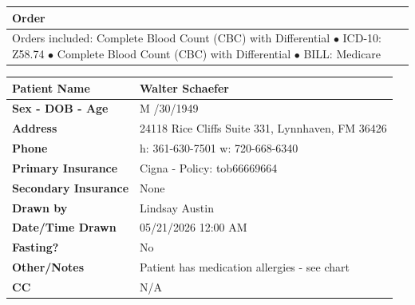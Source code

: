\documentclass[11pt]{article}
\begin{document}
\vspace{-1pt}


\begin{tabularx}{\textwidth}{|X|}
\hline
\textbf{Order}
\\
\hline

Orders included:
Complete Blood Count (CBC) with Differential
$\bullet$
ICD-10:
Z58.74
$\bullet$
Complete Blood Count (CBC) with Differential
$\bullet$
BILL:
Medicare

\\
\hline
\end{tabularx}

\vspace{-1pt}


\begin{tabularx}{\textwidth}{|p{2.9in}|X|}
\hline
\textbf{Patient Name}
&
Walter Schaefer
\\
\hline

\textbf{Sex - DOB - Age}
&
M
\quad
06/30/1949
\quad
76
\\
\hline

\textbf{Address}
&
24118 Rice Cliffs Suite 331, Lynnhaven, FM 36426
\\
\hline

\textbf{Phone}
&
h: 361-630-7501
\quad
w: 720-668-6340
\\
\hline

\textbf{Primary Insurance}
&
Cigna - Policy: tob66669664
\\
\hline

\textbf{Secondary Insurance}
&
None
\\
\hline

\textbf{Drawn by}
&
Lindsay Austin
\\
\hline

\textbf{Date/Time Drawn}
&
05/21/2026 12:00 AM
\\
\hline

\textbf{Fasting?}
&
No
\\
\hline

\textbf{Other/Notes}
&
Patient has medication allergies - see chart
\\
\hline

\textbf{CC}
&
N/A
\\
\hline

\end{tabularx}
\end{document}

